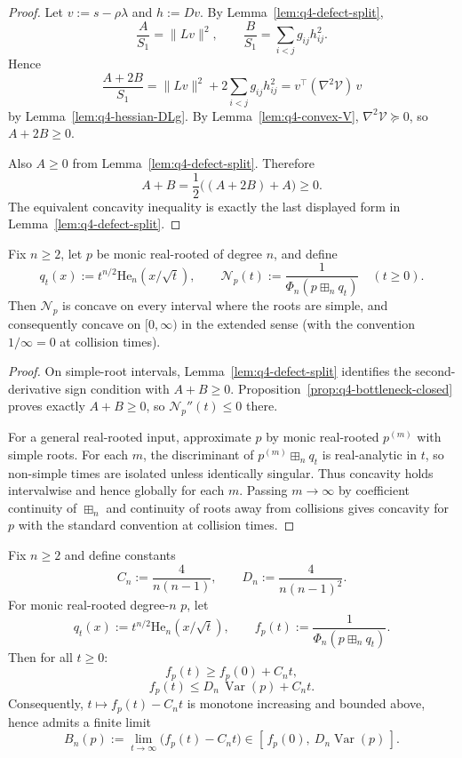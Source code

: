 \begin{proof}
Let $v:=s-\rho\lambda$ and $h:=Dv$.
By Lemma~\ref{lem:q4-defect-split},
\[
\frac{A}{S_1}=\|Lv\|^2,\qquad
\frac{B}{S_1}=\sum_{i<j} g_{ij}h_{ij}^2.
\]
Hence
\[
\frac{A+2B}{S_1}
=
\|Lv\|^2+2\sum_{i<j} g_{ij}h_{ij}^2
=
v^\top(\nabla^2\mathcal V)\,v
\]
by Lemma~\ref{lem:q4-hessian-DLg}.
By Lemma~\ref{lem:q4-convex-V}, $\nabla^2\mathcal V\succeq 0$, so
$A+2B\ge 0$.

Also $A\ge 0$ from Lemma~\ref{lem:q4-defect-split}. Therefore
\[
A+B=\frac12\big((A+2B)+A\big)\ge 0.
\]
The equivalent concavity inequality is exactly the last displayed form in
Lemma~\ref{lem:q4-defect-split}.
\end{proof}

\begin{theorem}\label{thm:q4-alln-concavity}
Fix $n\ge 2$, let $p$ be monic real-rooted of degree $n$, and define
\[
q_t(x):=t^{n/2}\mathrm{He}_n(x/\sqrt t),\qquad
\mathcal N_p(t):=\frac1{\Phi_n(p\boxplus_n q_t)}\quad (t\ge 0).
\]
Then $\mathcal N_p$ is concave on every interval where the roots are simple,
and consequently concave on $[0,\infty)$ in the extended sense
(with the convention $1/\infty=0$ at collision times).
\end{theorem}

\begin{proof}
On simple-root intervals, Lemma~\ref{lem:q4-defect-split} identifies
the second-derivative sign condition with $A+B\ge 0$.
Proposition~\ref{prop:q4-bottleneck-closed} proves exactly $A+B\ge 0$,
so $\mathcal N_p''(t)\le 0$ there.

For a general real-rooted input, approximate $p$ by monic real-rooted
$p^{(m)}$ with simple roots.
For each $m$, the discriminant of $p^{(m)}\boxplus_n q_t$ is real-analytic
in $t$, so non-simple times are isolated unless identically singular.
Thus concavity holds intervalwise and hence globally for each $m$.
Passing $m\to\infty$ by coefficient continuity of $\boxplus_n$ and
continuity of roots away from collisions gives concavity for $p$
with the standard convention at collision times.
\end{proof}

\begin{proposition}\label{prop:q4-semi-linear-bounds}
Fix $n\ge 2$ and define constants
\[
C_n:=\frac{4}{n(n-1)},
\qquad
D_n:=\frac{4}{n(n-1)^2}.
\]
For monic real-rooted degree-$n$ $p$, let
\[
q_t(x):=t^{n/2}\mathrm{He}_n(x/\sqrt t),
\qquad
f_p(t):=\frac1{\Phi_n(p\boxplus_n q_t)}.
\]
Then for all $t\ge 0$:
\[
f_p(t)\ge f_p(0)+C_n t,
\]
\[
f_p(t)\le D_n\,\operatorname{Var}(p)+C_n t.
\]
Consequently, $t\mapsto f_p(t)-C_n t$ is monotone increasing and bounded above,
hence admits a finite limit
\[
B_n(p):=\lim_{t\to\infty}\bigl(f_p(t)-C_n t\bigr)
\in [\,f_p(0),\ D_n\operatorname{Var}(p)\,].
\]
\end{proposition}

